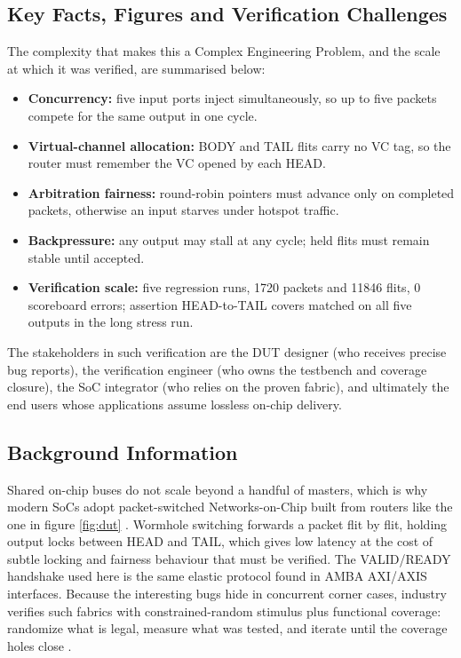 \documentclass[11pt,a4paper]{report}  %
\begin{document}
\subsection{Key Facts, Figures and Verification Challenges}

The complexity that makes this a Complex Engineering Problem, and the scale at
which it was verified, are summarised below:

\begin{itemize}
    \item \textbf{Concurrency:} five input ports inject simultaneously, so up
    to five packets compete for the same output in one cycle.
    \item \textbf{Virtual-channel allocation:} BODY and TAIL flits carry no VC
    tag, so the router must remember the VC opened by each HEAD.
    \item \textbf{Arbitration fairness:} round-robin pointers must advance only
    on completed packets, otherwise an input starves under hotspot traffic.
    \item \textbf{Backpressure:} any output may stall at any cycle; held flits
    must remain stable until accepted.
    \item \textbf{Verification scale:} five regression runs, 1720 packets and
    11846 flits, 0 scoreboard errors; assertion HEAD-to-TAIL covers matched on
    all five outputs in the long stress run.
\end{itemize}

The stakeholders in such verification are the DUT designer (who receives
precise bug reports), the verification engineer (who owns the testbench and
coverage closure), the SoC integrator (who relies on the proven fabric), and
ultimately the end users whose applications assume lossless on-chip delivery.

\subsection{Background Information}

Shared on-chip buses do not scale beyond a handful of masters, which is why
modern SoCs adopt packet-switched Networks-on-Chip built from routers like the
one in figure \ref{fig:dut} \cite{Dally}. Wormhole switching forwards a packet
flit by flit, holding output locks between HEAD and TAIL, which gives low
latency at the cost of subtle locking and fairness behaviour that must be
verified. The VALID/READY handshake used here is the same elastic protocol
found in AMBA AXI/AXIS interfaces. Because the interesting bugs hide in
concurrent corner cases, industry verifies such fabrics with constrained-random
stimulus plus functional coverage: randomize what is legal, measure what was
tested, and iterate until the coverage holes close \cite{Spear}\cite{Bergeron}.
\end{document}
